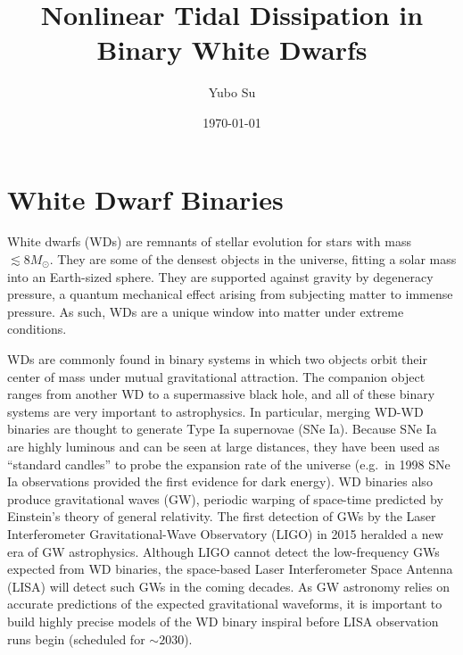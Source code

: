 \documentclass[11pt,
        usenames, %
        dvipsnames %
    ]{article}
\begin{document}

\def\Snospace~{\S{}} %
\renewcommand*{\sectionautorefname}{\Snospace}
\renewcommand*{\appendixautorefname}{\Snospace}
\renewcommand*{\figureautorefname}{Fig.}
\renewcommand*{\equationautorefname}{Eq.}
\renewcommand*{\tableautorefname}{Tab.}

\onehalfspacing

\pagestyle{fancy}
\rhead{}
\cfoot{\thepage/\pageref{LastPage}}

\title{Nonlinear Tidal Dissipation in Binary White Dwarfs}
\author{Yubo Su}
\date{\today}

\maketitle


\section{White Dwarf Binaries}

White dwarfs (WDs) are remnants of stellar evolution for stars with mass
$\lesssim 8M_{\odot}$. They are some of the densest objects in the universe,
fitting a solar mass into an Earth-sized sphere. They are supported against
gravity by degeneracy pressure, a quantum mechanical effect arising from
subjecting matter to immense pressure. As such, WDs are a unique window into
matter under extreme conditions.

WDs are commonly found in binary systems in which two objects orbit their center
of mass under mutual gravitational attraction. The companion object ranges from
another WD to a supermassive black hole, and all of these binary systems are
very important to astrophysics. In particular, merging WD-WD binaries are
thought to generate Type Ia supernovae (SNe Ia). Because SNe Ia are highly
luminous and can be seen at large distances, they have been used as ``standard
candles'' to probe the expansion rate of the universe (e.g.\ in 1998 SNe Ia
observations provided the first evidence for dark energy\cite{DE}). WD binaries
also produce gravitational waves (GW), periodic warping of space-time predicted
by Einstein's theory of general relativity. The first detection of GWs by the
Laser Interferometer Gravitational-Wave Observatory (LIGO) in 2015 heralded a
new era of GW astrophysics. Although LIGO cannot detect the low-frequency GWs
expected from WD binaries, the space-based Laser Interferometer Space Antenna
(LISA) will detect such GWs in the coming decades\cite{lisa}. As GW astronomy
relies on accurate predictions of the expected gravitational waveforms, it is
important to build highly precise models of the WD binary inspiral before LISA
observation runs begin (scheduled for $\sim 2030$).
\end{document}
